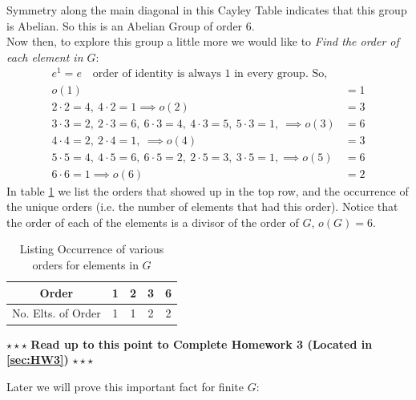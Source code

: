 \begin{example}
\noindent Symmetry along the main diagonal in this Cayley Table indicates that this group is Abelian. So this is an Abelian Group of order 6. \steezybreak\\
\noindent Now then, to explore this group a little more we would like to \textit{Find the order of each element in $G$}:
\begin{align}
    e^1=e \ \ \ \text{ order of identity is always 1 in every group. So,}  \nonumber \\
    o(1)&=1  \nonumber \\
    2\cdot 2= 4, \ 4\cdot 2= 1 \implies o(2)&=3 \nonumber \\
    3\cdot 3= 2, \ 2\cdot 3= 6, \ 6\cdot 3=4,\ 4\cdot 3= 5,\ 5\cdot 3= 1,\ \implies  o(3)&=6 \nonumber \\
    4\cdot 4= 2,\ 2\cdot 4= 1, \ \implies o(4)&=3 \nonumber \\
    5\cdot 5= 4, \ 4\cdot 5= 6, \ 6\cdot 5=2,\ 2\cdot 5= 3,\ 3\cdot 5= 1, \implies o(5)&=6 \nonumber \\
    6\cdot 6 = 1 \implies o(6)&=2  \nonumber
\end{align}
In table \ref{tab:order_occur} we list the orders that showed up in the top row, and the occurrence of the unique orders (i.e. the number of elements that had this order). Notice that the order of each of the elements is a divisor of the order of $G$, $o(G)=6$.  
\begin{table}[h!]
    \centering
    \begin{tabular}{|c|c|c|c|c|}\hline
         Order&1&2&3&6   \\ \hline
         No. Elts. of Order& 1&1&2&2 \\ \hline
    \end{tabular}
    \caption{Listing Occurrence of various orders for elements in $G$}
    \label{tab:order_occur}
\end{table}
\end{example}
\steezybreak
\begin{tcolorbox}
\begin{center}
    $\star\star\star$ \textbf{Read up to this point to Complete Homework 3 (Located in \ref{sec:HW3})} $\star\star\star$
\end{center}
\end{tcolorbox}
\steezybreak
\newpage
\noindent Later we will prove this important fact for finite $G$:
